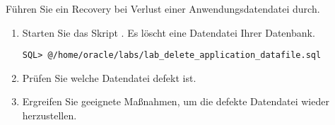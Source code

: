     \item F\"uhren Sie ein Recovery bei Verlust einer Anwendungsdatendatei durch.
      \begin{enumerate}
        \item Starten Sie das Skript . Es l\"oscht eine Datendatei Ihrer Datenbank.
          \begin{lstlisting}[language=terminal]
SQL> @/home/oracle/labs/lab_delete_application_datafile.sql
          \end{lstlisting}
        \item Pr\"ufen Sie welche Datendatei defekt ist.
        \item Ergreifen Sie geeignete Ma\ss{}nahmen, um die defekte Datendatei wieder herzustellen.
      \end{enumerate}
